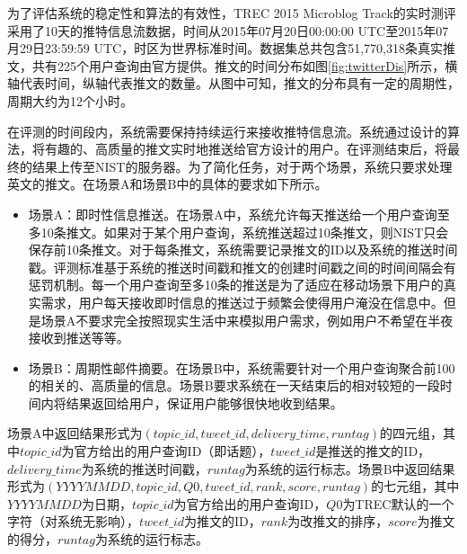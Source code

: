 为了评估系统的稳定性和算法的有效性，TREC 2015 Microblog Track的实时测评采用了10天的推特信息流数据，时间从2015年07月20日00:00:00 UTC至2015年07月29日23:59:59 UTC，时区为世界标准时间。数据集总共包含51,770,318条真实推文，共有225个用户查询由官方提供。推文的时间分布如图\ref{fig:twitterDis}所示，横轴代表时间，纵轴代表推文的数量。从图中可知，推文的分布具有一定的周期性，周期大约为12个小时。

在评测的时间段内，系统需要保持持续运行来接收推特信息流。系统通过设计的算法，将有趣的、高质量的推文实时地推送给官方设计的用户。在评测结束后，将最终的结果上传至NIST的服务器。为了简化任务，对于两个场景，系统只要求处理英文的推文。在场景A和场景B中的具体的要求如下所示。
\begin{itemize}
  \item 场景A：即时性信息推送。在场景A中，系统允许每天推送给一个用户查询至多10条推文。如果对于某个用户查询，系统推送超过10条推文，则NIST只会保存前10条推文。对于每条推文，系统需要记录推文的ID以及系统的推送时间戳。评测标准基于系统的推送时间戳和推文的创建时间戳之间的时间间隔会有惩罚机制。每一个用户查询至多10条的推送是为了适应在移动场景下用户的真实需求，用户每天接收即时信息的推送过于频繁会使得用户淹没在信息中。但是场景A不要求完全按照现实生活中来模拟用户需求，例如用户不希望在半夜接收到推送等等。
  \item 场景B：周期性邮件摘要。在场景B中，系统需要针对一个用户查询聚合前100的相关的、高质量的信息。场景B要求系统在一天结束后的相对较短的一段时间内将结果返回给用户，保证用户能够很快地收到结果。
\end{itemize}

场景A中返回结果形式为$(topic\_id,tweet\_id,delivery\_time,runtag)$的四元组，其中$topic\_id$为官方给出的用户查询ID（即话题），$tweet\_id$是推送的推文的ID，$delivery\_time$为系统的推送时间戳，$runtag$为系统的运行标志。场景B中返回结果形式为$(YYYYMMDD, topic\_id, Q0, tweet\_id, rank, score, runtag)$的七元组，其中$YYYYMMDD$为日期，$topic\_id$为官方给出的用户查询ID，$Q0$为TREC默认的一个字符（对系统无影响），$tweet\_id$为推文的ID，$rank$为改推文的排序，$score$为推文的得分，$runtag$为系统的运行标志。
